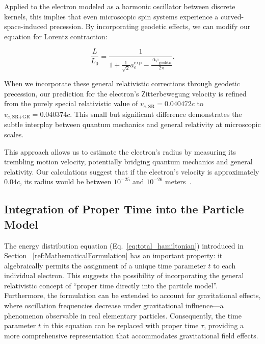 \documentclass[%
 reprint,
 amsmath,amssymb,
 aps,
]{revtex4-1}
\numberwithin{equation}{section}%
\begin{document}
Applied to the electron modeled as a harmonic oscillator between discrete kernels, this implies that even microscopic spin systems experience a curved-space-induced precession. By incorporating geodetic effects, we can modify our equation for Lorentz contraction:

\vspace{0.1cm}

\begin{equation}
\frac{L}{L_0} = \frac{1}{1 + \frac{1}{\sqrt{2}}a_e^{\text{exp}} - \frac{\Delta\varphi_{\text{geodetic}}}{2\pi}}.
\label{eq:core_equation}
\end{equation}

\vspace{0.3cm}

When we incorporate these general relativistic corrections through geodetic precession, our prediction for the electron's Zitterbewegung velocity is refined from the purely special relativistic value of $v_{e,\text{SR}} = 0.040472c$ to $v_{e,\text{SR+GR}} = 0.040374c$. This small but significant difference demonstrates the subtle interplay between quantum mechanics and general relativity at microscopic scales.

This approach allows us to estimate the electron's radius by measuring its trembling motion velocity, potentially bridging quantum mechanics and general relativity. Our calculations suggest that if the electron's velocity is approximately $0.04c$, its radius would be between $10^{-25}$ and $10^{-26}$ meters~\cite{hanamura2025}.


\subsection{Integration of Proper Time into the Particle Model}

The energy distribution equation (Eq.~\ref{eq:total_hamiltonian}) introduced in Section ~\ref{ref:MathematicalFormulation} has an important property: it algebraically permits the assignment of a unique time parameter $t$ to each individual electron. This suggests the possibility of incorporating the general relativistic concept of ``proper time directly into the particle model''. Furthermore, the formulation can be extended to account for gravitational effects, where oscillation frequencies decrease under gravitational influence—a phenomenon observable in real elementary particles. Consequently, the time parameter $t$ in this equation can be replaced with proper time $\tau$, providing a more comprehensive representation that accommodates gravitational field effects.
\end{document}
